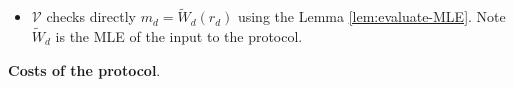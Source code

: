\documentclass{article}
\begin{document}
\begin{boxx1}
\begin{itemize}
\begin{enumerate}[$\circ$]
\begin{enumerate}[-]
\item\label{item:22} Regarding $\mathcal{V}$'s final check for the random point $(b^{*}, c^{*}) \in \F^{k_{i+1}} \times \F^{k_{i+1}}$, $\mathcal{P}$ claims to $\mathcal{V}$ the function $q_{i+1} = \widetilde{W}_{i+1} \circ l$ where $l(0) = b^{*}$ and $l(1) = c^{*}$
\item\label{item:23} $\mathcal{V}$ simply finishes the sum-check protocol after the final evaluation using $q_{i+1}(0) = \widetilde{W}_{i+1}(b^{*})$ and $q_{i+1}(1) = \widetilde{W}_{i+1}(c^{*})$. 
\end{enumerate}
\item\label{item:24} $\mathcal{V}$ chooses $r^{*} \in \F$ at random and sets $r_{i+1} = l(r^{*})$, compute $m_{i+1} = \widetilde{W}_{i+1}(r_{i+1})$ which is reserved for next round's use.
\end{enumerate}
\item $\mathcal{V}$ checks directly $m_d = \widetilde{W}_d(r_d)$ using the Lemma \ref{lem:evaluate-MLE}. Note $\widetilde{W}_d$ is the MLE of the input to the protocol. 
\end{itemize}
\end{boxx1}

\textbf{Costs of the protocol}. 
\end{document}
